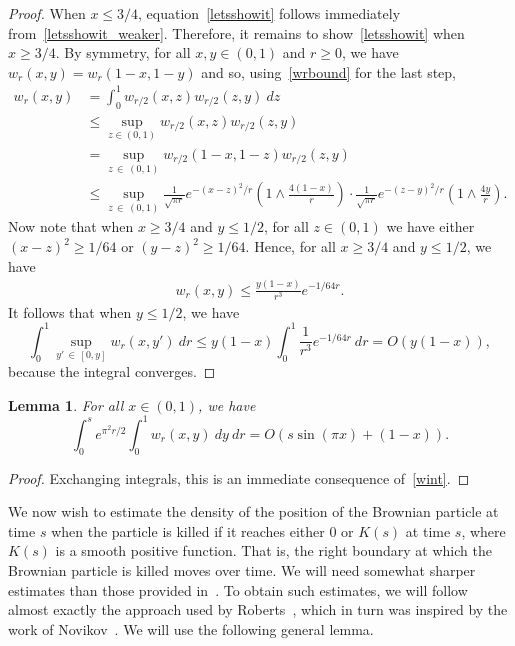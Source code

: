 \documentclass[10pt]{amsart}
\newtheorem{lemm}[theo]{Lemma}\newtheorem{prop}[theo]{Proposition}\newtheorem{coro}[theo]{Corollary}\newtheorem{conj}[theo]{Conjecture}
\theoremstyle{definition}\newtheorem{defi}[theo]{Definition}\newtheorem{rema}[theo]{Remark}\newtheorem{exam}[theo]{Example}\newtheorem{exem}[theo]{Example}\newtheorem{nota}[theo]{Notation}
\newcommand{\1} {\mathds{1}}
\begin{document}
\begin{proof}
When $x \leq 3/4$, equation~\eqref{letsshowit} follows immediately from~\eqref{letsshowit_weaker}. Therefore, it remains to show~\eqref{letsshowit} when $x \geq 3/4$. By symmetry, for all $x,y \in (0,1)$ and $r\ge0$, we have $w_r(x,y) = w_r(1-x, 1-y)$ and so, using~\eqref{wrbound} for the last step,
\begin{align*}
w_r(x,y) &= \int_0^1 w_{r/2}(x,z) w_{r/2}(z,y) \: dz \\
&\leq \sup_{z \in (0,1)} w_{r/2}(x,z) w_{r/2}(z,y) \\
&= \sup_{z\,\in\,(0,1)} w_{r/2}(1-x, 1-z) w_{r/2}(z,y) \\
&\leq \sup_{z\,\in\,(0,1)} \frac{1}{\sqrt{\pi r}} e^{-(x-z)^2/r} \left(1 \wedge \frac{4(1-x)}{r} \right) \cdot \frac{1}{\sqrt{\pi r}} e^{-(z-y)^2/r} \left(1 \wedge \frac{4y}{r} \right).
\end{align*}
Now note that when $x \geq 3/4$ and $y \leq 1/2$, for all $z \in (0,1)$ we have either $(x-z)^2 \geq 1/64$ or $(y-z)^2 \geq 1/64$. Hence, for all $x \geq 3/4$ and $y \leq 1/2$, we have
\begin{align*}
w_r(x,y) \leq \frac{y(1-x)}{r^3} e^{-1/64r}.
\end{align*}
It follows that when $y \leq 1/2$, we have
\[
\int_0^1 \sup_{y'\,\in\,[0, y]} w_r(x,y') \: dr \leq y(1-x) \int_0^1 \frac{1}{r^3} e^{-1/64r} \: dr = O(y(1-x)),
\]
because the integral converges.
\end{proof}

\begin{lemm}\label{wint2}
For all $x \in (0,1)$, we have
\[
\int_0^s e^{\pi^2 r/2} \int_0^1 w_r(x,y) \: dy \: dr = O(s \sin(\pi x) + (1-x)).
\]
\end{lemm}

\begin{proof}
Exchanging integrals, this is an immediate consequence of~\eqref{wint}.
\end{proof}

We now wish to estimate the density of the position of the Brownian particle at time $s$ when the particle is killed if it reaches either $0$ or $K(s)$ at time $s$, where $K(s)$ is a smooth positive function. That is, the right boundary at which the Brownian particle is killed moves over time. We will need somewhat sharper estimates than those provided in~\cite{bbs}. To obtain such estimates, we will follow almost exactly the approach used by Roberts~\cite{roberts}, which in turn was inspired by the work of Novikov~\cite{nov}. We will use the following general lemma.
\end{document}
